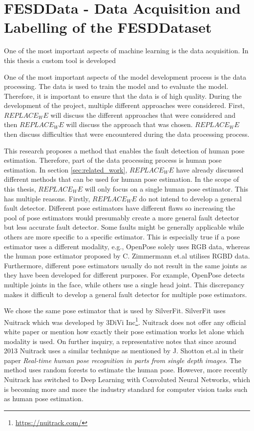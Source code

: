 \chapter[FESDData]{FESDData - Data Acquisition and Labelling of the FESDDataset}
\label{sec:data_processing}

One of the most important aspects of machine learning is the data acquisition. In this thesis a custom tool is developed

One of the most important aspects of the model development process is the data processing. The data is used to train the model and to evaluate the model. Therefore, it is important to ensure that the data is of high quality. During the development of the project, multiple different approaches were considered. First, $REPLACE_WE$ will discuss the different approaches that were considered and then $REPLACE_WE$ will discuss the approach that was chosen. $REPLACE_WE$ then discuss difficulties that were encountered during the data processing process.

This research proposes a method that enables the fault detection of human pose estimation. Therefore, part of the data processing process is human pose estimation. In section \ref{sec:related_work}, $REPLACE_WE$ have already discussed different methods that can be used for human pose estimation. In the scope of this thesis, $REPLACE_WE$ will only focus on a single human pose estimator. This has multiple reasons. Firstly, $REPLACE_WE$ do not intend to develop a general fault detector. Different pose estimators have different flaws so increasing the pool of pose estimators would presumably create a more general fault detector but less accurate fault detector. Some faults might be generally applicable while others are more specific to a specific estimator. This is especially true if a pose estimator uses a different modality, e.g., OpenPose solely uses RGB data, whereas the human pose estimator proposed by C. Zimmermann et.al utilises RGBD data\cite{OpenPosePose, RGBDHPEforRoboticTaskLearning}. Furthermore, different pose estimators usually do not result in the same joints as they have been developed for different purposes. For example, OpenPose detects multiple joints in the face, while others use a single head joint. This discrepancy makes it difficult to develop a general fault detector for multiple pose estimators. 

We chose the same pose estimator that is used by SilverFit. SilverFit uses Nuitrack which was developed by 3DiVi Inc\footnote{\url{https://nuitrack.com/}}. Nuitrack does not offer any official white paper or mention how exactly their pose estimation works let alone which modality is used. On further inquiry, a representative notes that since around 2013 Nuitrack uses a similar technique as mentioned by J. Shotton et.al in their paper \textit{Real-time human pose recognition in parts from single depth images}\cite{EarlyRGBDHPE}. The method uses random forests to estimate the human pose. However, more recently Nuitrack has switched to Deep Learning with Convoluted Neural Networks, which is becoming more and more the industry standard for computer vision tasks such as human pose estimation.





